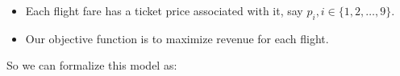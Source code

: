 \documentclass[12pt,letterpaper]{article}
\begin{document}
\begin{enumerate}
\begin{itemize}
        \item
          Each flight fare has a ticket price associated with it,
          say $p_i, i \in \{1, 2, \dots, 9\}$.

        \item
          Our objective function is to maximize revenue for each flight.
      \end{itemize}

      So we can formalize this model as:


\end{enumerate}
\end{document}

